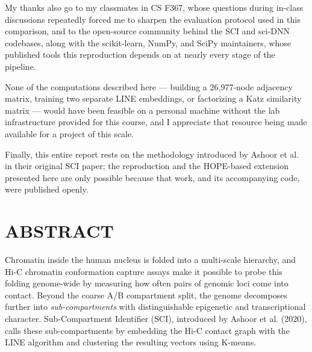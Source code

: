\documentclass[12pt]{article}
\begin{document}
My thanks also go to my classmates in CS F367, whose questions during in-class discussions
repeatedly forced me to sharpen the evaluation protocol used in this comparison, and to the
open-source community behind the SCI and sci-DNN codebases, along with the scikit-learn,
NumPy, and SciPy maintainers, whose published tools this reproduction depends on at nearly
every stage of the pipeline.

None of the computations described here — building a 26,977-node adjacency matrix, training
two separate LINE embeddings, or factorizing a Katz similarity matrix — would have been
feasible on a personal machine without the lab infrastructure provided for this course, and I
appreciate that resource being made available for a project of this scale.

Finally, this entire report rests on the methodology introduced by Ashoor et al. in their original
SCI paper; the reproduction and the HOPE-based extension presented here are only possible
because that work, and its accompanying code, were published openly.

\section*{ABSTRACT}

Chromatin inside the human nucleus is folded into a multi-scale hierarchy, and Hi-C chromatin
conformation capture assays make it possible to probe this folding genome-wide by measuring how
often pairs of genomic loci come into contact. Beyond the coarse A/B compartment split, the
genome decomposes further into \textit{sub-compartments} with distinguishable epigenetic and
transcriptional character. Sub-Compartment Identifier (SCI), introduced by Ashoor et al. (2020),
calls these sub-compartments by embedding the Hi-C contact graph with the LINE algorithm and
clustering the resulting vectors using K-means.
\end{document}
